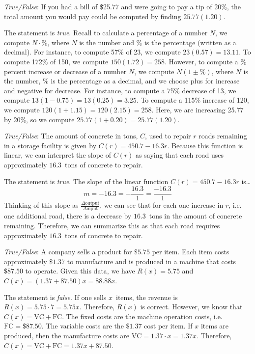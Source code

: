 \documentclass[11pt,letterpaper]{article}
\begin{document}
\thispagestyle{title}


\quizsol \textit{True/False}: If you had a bill of \$25.77 and were going to pay a tip of 20\%, the total amount you would pay could be computed by finding $25.77(1.20)$. \pspace

\sol The statement is \textit{true}. Recall to calculate a percentage of a number $N$, we compute $N \cdot \%$, where $N$ is the number and $\%$ is the percentage (written as a decimal). For instance, to compute 57\% of 23, we compute $23(0.57)= 13.11$. To compute 172\% of 150, we compute $150(1.72)= 258$. However, to compute a $\%$ percent increase or decrease of a number $N$, we compute $N(1 \pm \%)$, where $N$ is the number, $\%$ is the percentage as a decimal, and we choose plus for increase and negative for decrease. For instance, to compute a 75\% decrease of 13, we compute $13(1 - 0.75)= 13(0.25)= 3.25$. To compute a 115\% increase of 120, we compute $120(1 + 1.15)= 120(2.15)= 258$. Here, we are increasing 25.77 by 20\%, so we compute $25.77(1 + 0.20)= 25.77(1.20)$. \pvspace{0.5cm}



\quizsol \textit{True/False}: The amount of concrete in tons, $C$, used to repair $r$ roads remaining in a storage facility is given by $C(r)= 450.7 - 16.3r$. Because this function is linear, we can interpret the slope of $C(r)$ as saying that each road uses approximately $16.3$~tons of concrete to repair. \pspace

\sol The statement is \textit{true}. The slope of the linear function $C(r)= 450.7 - 16.3r$ is\dots
	\[
	m= -16.3= -\dfrac{16.3}{1}= \dfrac{-16.3}{1}
	\]
Thinking of this slope as $\frac{\Delta \text{output}}{\Delta \text{input}}$, we can see that for each one increase in $r$, i.e. one additional road, there is a decrease by $16.3$~tons in the amount of concrete remaining. Therefore, we can summarize this as that each road requires approximately $16.3$~tons of concrete to repair. \pvspace{0.5cm}



\quizsol \textit{True/False}: A company sells a product for $\$5.75$ per item. Each item costs approximately $\$1.37$ to manufacture and is produced in a machine that costs $\$87.50$ to operate. Given this data, we have $R(x)= 5.75$ and $C(x)= (1.37 + 87.50)x= 88.88x$. \pspace

\sol The statement is \textit{false}. If one sells $x$~items, the revenue is $R(x)= 5.75 \cdot 7= 5.75x$. Therefore, $R(x)$ is correct. However, we know that $C(x)= \text{VC} + \text{FC}$. The fixed costs are the machine operation costs, i.e. $\text{FC}= \$87.50$. The variable costs are the $\$1.37$ cost per item. If $x$ items are produced, then the manufacture costs are $\text{VC}= 1.37 \cdot x= 1.37x$. Therefore, $C(x)= \text{VC} + \text{FC}= 1.37x + 87.50$. \pvspace{0.5cm}
\end{document}
